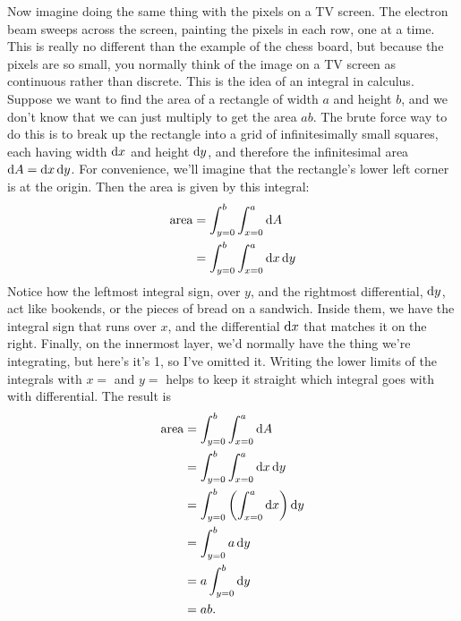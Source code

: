 Now imagine doing the same thing with the pixels on a TV screen. The electron
beam sweeps across the screen, painting the pixels in each row, one at a time.
This is really no different than the example of the chess board, but because the
pixels are so small, you normally think of the image on a TV screen as continuous
rather than discrete.
This is the idea of an integral in calculus.
Suppose we want to find the area of a rectangle of width
$a$ and height $b$, and we don't know that we can just multiply to get the
area $ab$. The brute force way to do this is to break up the rectangle into
a grid of infinitesimally small squares, each having width $\operatorname{d\!} x$ and
height $\operatorname{d\!} y$, and therefore the infinitesimal area $\operatorname{d\!} A = \operatorname{d\!} x \operatorname{d\!} y$.
For convenience, we'll imagine that the rectangle's
lower left corner is at the origin. Then the area is given by this integral:
\begin{align*}
  \text{area} &= \int_{y=0}^b \int_{x=0}^a \operatorname{d\!} A \\
              &= \int_{y=0}^b \int_{x=0}^a \operatorname{d\!} x \operatorname{d\!} y 
\end{align*}
Notice how the leftmost integral sign, over $y$, and the rightmost differential, $\operatorname{d\!} y$,
act like bookends, or the pieces of bread on a sandwich. Inside them, we have
the integral sign that runs over $x$, and the differential $\operatorname{d\!} x$ that matches
it on the right. Finally, on the innermost layer, we'd normally
have the thing we're integrating, but here's it's 1, so I've omitted it. Writing the
lower limits of the integrals with $x=$ and $y=$ helps to keep it straight which
integral goes with with differential. The result is
\begin{align*}
  \text{area} &= \int_{y=0}^b \int_{x=0}^a \operatorname{d\!} A \\
              &= \int_{y=0}^b \int_{x=0}^a \operatorname{d\!} x \operatorname{d\!} y \\
              &= \int_{y=0}^b \left(\int_{x=0}^a \operatorname{d\!} x\right) \operatorname{d\!} y \\
              &= \int_{y=0}^b a \operatorname{d\!} y \\
              &= a \int_{y=0}^b \operatorname{d\!} y \\
              &= ab.
\end{align*}

